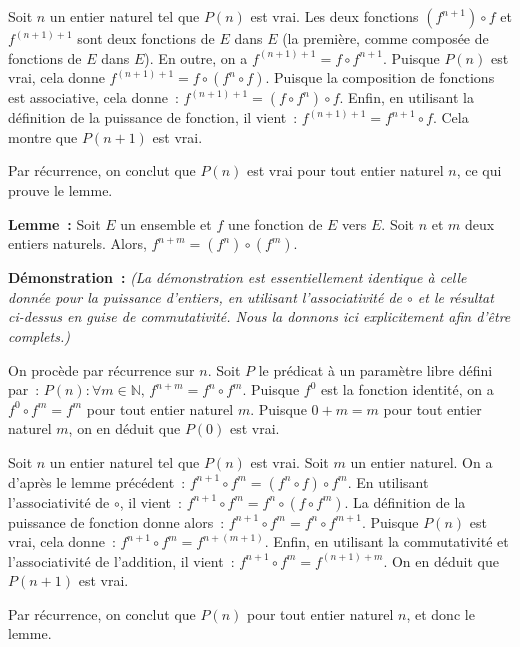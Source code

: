     Soit $n$ un entier naturel tel que $P(n)$ est vrai. 
    Les deux fonctions $(f^{n+1}) \circ f$ et $f^{(n+1)+1}$ sont deux fonctions de $E$ dans $E$ (la première, comme composée de fonctions de $E$ dans $E$). 
    En outre, on a $f^{(n+1)+1} = f \circ f^{n+1}$.
    Puisque $P(n)$ est vrai, cela donne $f^{(n+1)+1} = f \circ (f^n \circ f)$. 
    Puisque la composition de fonctions est associative, cela donne : $f^{(n+1)+1} = (f \circ f^n) \circ f$.
    Enfin, en utilisant la définition de la puissance de fonction, il vient : $f^{(n+1)+1} = f^{n+1} \circ f$.
    Cela montre que $P(n+1)$ est vrai.
    
    Par récurrence, on conclut que $P(n)$ est vrai pour tout entier naturel $n$, ce qui prouve le lemme. 

   \done 

\medskip

\noindent\textbf{Lemme :} 
    Soit $E$ un ensemble et $f$ une fonction de $E$ vers $E$.
    Soit $n$ et $m$ deux entiers naturels. 
    Alors, $f^{n+m} = (f^n) \circ (f^m)$.

\medskip

\noindent\textbf{Démonstration :} \textit{(La démonstration est essentiellement identique à celle donnée pour la puissance d'entiers, en utilisant l'associativité de $\circ$ et le résultat ci-dessus en guise de commutativité. Nous la donnons ici explicitement afin d'être complets.)}

    On procède par récurrence sur $n$. 
    Soit $P$ le prédicat à un paramètre libre défini par : $P(n) : \forall m \in \mathbb{N}, \, f^{n+m} = f^n \circ f^m$. 
    Puisque $f^0$ est la fonction identité, on a $f^0 \circ f^m = f^m$ pour tout entier naturel $m$. 
    Puisque $0 + m = m$ pour tout entier naturel $m$, on en déduit que $P(0)$ est vrai. 

    Soit $n$ un entier naturel tel que $P(n)$ est vrai. 
    Soit $m$ un entier naturel. 
    On a d'après le lemme précédent : $f^{n+1} \circ f^m = (f^n \circ f) \circ f^m$. 
    En utilisant l'associativité de $\circ$, il vient : $f^{n+1} \circ f^m = f^n \circ (f \circ f^m)$. 
    La définition de la puissance de fonction donne alors : $f^{n+1} \circ f^m = f^n \circ f^{m+1}$. 
    Puisque $P(n)$ est vrai, cela donne : $f^{n+1} \circ f^m = f^{n+(m+1)}$. 
    Enfin, en utilisant la commutativité et l'associativité de l'addition, il vient : $f^{n+1} \circ f^m = f^{(n+1)+m}$. 
    On en déduit que $P(n+1)$ est vrai. 

    Par récurrence, on conclut que $P(n)$ pour tout entier naturel $n$, et donc le lemme.

